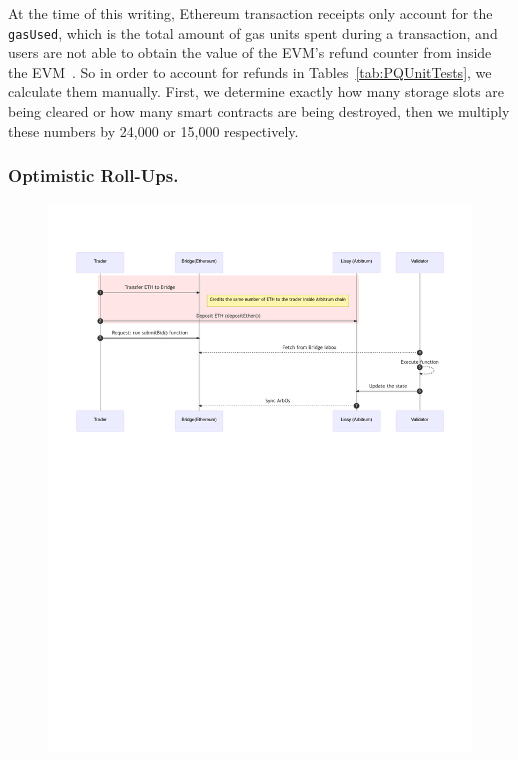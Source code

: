 At the time of this writing, Ethereum transaction receipts only account for the \texttt{gasUsed}, which is the total amount of gas units spent during a transaction, and users are not able to obtain the value of the EVM's refund counter from inside the EVM~\cite{signer2018gas}. So in order to account for refunds in  Tables~\ref{tab:PQUnitTests}, we calculate them manually. First, we determine exactly how many storage slots are being cleared or how many smart contracts are being destroyed, then we multiply these numbers by 24,000 or 15,000 respectively.

\subsubsection{Optimistic Roll-Ups.}
\label{app:rollup}


\begin{figure}[t]
\centering
\includegraphics[width=1\textwidth]{fig/lissyL2.pdf}
\caption{\footnotesize{}  \label{fig:lissyl2}}
\end{figure}


